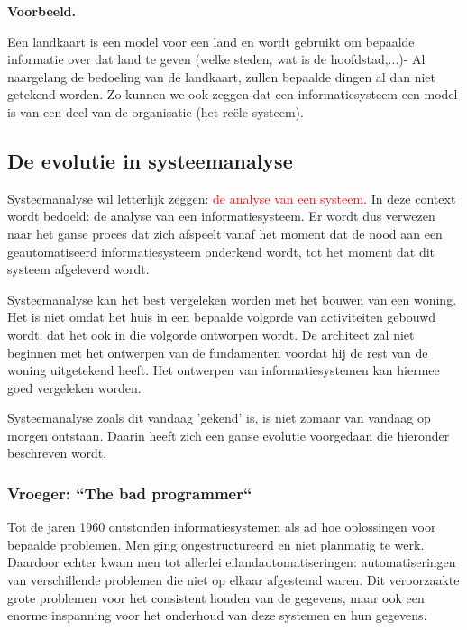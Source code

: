 \textbf{Voorbeeld.}

Een landkaart is een model voor een land en wordt gebruikt om bepaalde informatie over dat land te geven (welke steden, wat is de hoofdstad,...)- Al naargelang de bedoeling van de landkaart, zullen bepaalde dingen al dan niet getekend worden.
Zo kunnen we ook zeggen dat een informatiesysteem een model is van een deel van de organisatie (het reële systeem).

\subsection{De evolutie in systeemanalyse}

Systeemanalyse wil letterlijk zeggen: \textcolor{red}{de analyse van een systeem}. In deze context wordt bedoeld: de analyse van een informatiesysteem. Er wordt dus verwezen naar het ganse proces dat zich afspeelt vanaf het moment dat de nood aan een geautomatiseerd informatiesysteem onderkend wordt, tot het moment dat dit systeem afgeleverd wordt.

Systeemanalyse kan het best vergeleken worden met het bouwen van een woning. Het is niet omdat het huis in een bepaalde volgorde van activiteiten gebouwd wordt, dat het ook in die volgorde ontworpen wordt. De architect zal niet beginnen met het ontwerpen van de fundamenten voordat hij de rest van de woning uitgetekend heeft. Het ontwerpen van informatiesystemen kan hiermee goed vergeleken worden.

Systeemanalyse zoals dit vandaag 'gekend' is, is niet zomaar van vandaag op morgen ontstaan. Daarin heeft zich een ganse evolutie voorgedaan die hieronder beschreven wordt.

\subsubsection{Vroeger: \textquotedblleft The bad programmer\textquotedblleft }

Tot de jaren 1960 ontstonden informatiesystemen als ad hoe oplossingen voor bepaalde problemen. Men ging ongestructureerd en niet planmatig te werk. Daardoor echter kwam men tot allerlei eilandautomatiseringen: automatiseringen van verschillende problemen die niet op elkaar afgestemd waren. Dit veroorzaakte grote problemen voor het consistent houden van de gegevens, maar ook een enorme inspanning voor het onderhoud van deze systemen en hun gegevens.

